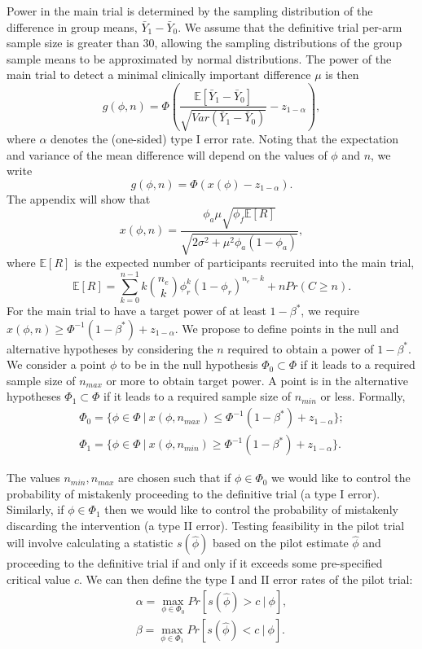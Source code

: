 \documentclass[AMA,STIX1COL]{WileyNJD-v2}
\begin{document}
Power in the main trial is determined by the sampling distribution of the difference in group means, $\bar{Y}_1 - \bar{Y}_0$. We assume that the definitive trial per-arm sample size is greater than 30, allowing the sampling distributions of the group sample means to be approximated by normal distributions. The power of the main trial to detect a minimal clinically important difference $\mu$ is then
$$
g(\phi, n) = \Phi \left(\frac{\mathbb{E}[\bar{Y}_1 - \bar{Y}_0]}{\sqrt{Var(\bar{Y}_1 - \bar{Y}_0)}} - z_{1-\alpha} \right),
$$
where $\alpha$ denotes the (one-sided) type I error rate. Noting that the expectation and variance of the mean difference will depend on the values of $\phi$ and $n$, we write
$$
g(\phi, n) = \Phi \left( x(\phi) - z_{1-\alpha} \right).
$$
The appendix will show that
$$
x(\phi, n) =  \frac{ \phi_a\mu \sqrt{\phi_f \mathbb{E}[R]} } {\sqrt{2\sigma^2 + \mu^2 \phi_a(1-\phi_a)}},
$$
where $\mathbb{E}[R]$ is the expected number of participants recruited into the main trial,
$$
\mathbb{E}[R] = \sum_{k=0}^{n-1} k{n_e \choose k} \phi_r^k (1-\phi_r)^{n_e - k} + n Pr(C \geq n).
$$
For the main trial to have a target power of at least $1 - \beta^*$, we require $x(\phi, n) \geq \Phi^{-1}(1 - \beta^*) + z_{1-\alpha}$. We propose to define points in the null and alternative hypotheses by considering the $n$ required to obtain a power of $1 - \beta^*$. We consider a point $\phi$ to be in the null hypothesis $\Phi_0 \subset \Phi$ if it leads to a required sample size of $n_{max}$ or more to obtain target power. A point is in the alternative hypotheses $\Phi_1 \subset \Phi$ if it leads to a required sample size of $n_{min}$ or less. Formally,
\begin{align*}
\Phi_0 = \{\phi \in \Phi ~ | ~ x(\phi, n_{max}) \leq \Phi^{-1}(1 - \beta^*) + z_{1-\alpha} \}; \\
\Phi_1 = \{\phi \in \Phi ~ | ~ x(\phi, n_{min}) \geq \Phi^{-1}(1 - \beta^*) + z_{1-\alpha}  \}.
\end{align*}

The values $n_{min}, n_{max}$ are chosen such that if $\phi \in \Phi_0$ we would like to control the probability of mistakenly proceeding to the definitive trial (a type I error). Similarly, if $\phi \in \Phi_1$ then we would like to control the probability of mistakenly discarding the intervention (a type II error). Testing feasibility in the pilot trial will involve calculating a statistic $s(\hat{\phi})$ based on the pilot estimate $\hat{\phi}$ and proceeding to the definitive trial if and only if it exceeds some pre-specified  critical value $c$. We can then define the type I and II error rates of the pilot trial:
\begin{align}\label{eqn:ocs}
\alpha = \max_{\phi \in \Phi_0} Pr[ s(\hat{\phi}) > c ~ | ~ \phi], \\
\beta = \max_{\phi \in \Phi_1} Pr[ s(\hat{\phi}) < c ~ | ~ \phi].
\end{align}
\end{document}
